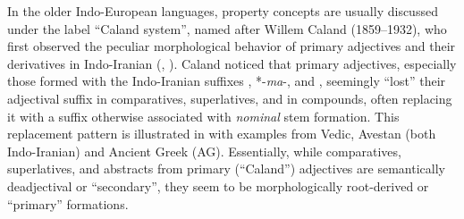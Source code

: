 \documentclass[output=paper,colorlinks,citecolor=brown]{langscibook}
\begin{document}
In the older Indo-European languages, property concepts are usually discussed under the label ``Caland system'',  named after Willem Caland (1859--1932), who first observed the peculiar morphological behavior of primary  adjectives and their derivatives in Indo-Iranian (\citealt{Caland1892}, \citeyear{Caland1893}).  Caland noticed that primary adjectives,  especially those formed with the Indo-Iranian suffixes , *\nobreakdash-\textit{ma}-, and , seemingly ``lost'' their adjectival suffix in comparatives, superlatives, and in compounds, often replacing it with a suffix  otherwise associated with \emph{nominal} stem formation. This replacement pattern is illustrated in  with examples from Vedic, Avestan (both Indo-Iranian) and Ancient Greek (AG). Essentially, while comparatives, superlatives, and abstracts from primary  (``Caland'')  adjectives are semantically deadjectival  or ``secondary'', they seem to be morphologically root-derived or ``primary'' formations. 
\end{document}
